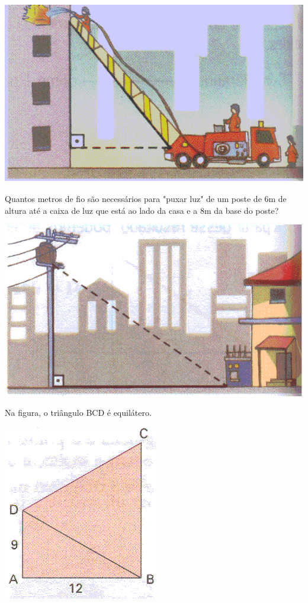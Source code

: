 \begin{center}
		\includegraphics[scale=0.5]{figuras/fig76.png}

	\end{center}	
	\item Quantos metros de fio são necessários para "puxar luz" de um poste de 6m de altura até a caixa de luz que está ao lado da casa e a 8m da base do poste?
\begin{center}
		\includegraphics[scale=0.5]{figuras/fig77.png}

	\end{center}	
	\item Na figura, o triângulo BCD é equilátero.
\begin{center}
	\includegraphics[scale=0.5]{figuras/fig78.png}

\end{center}
